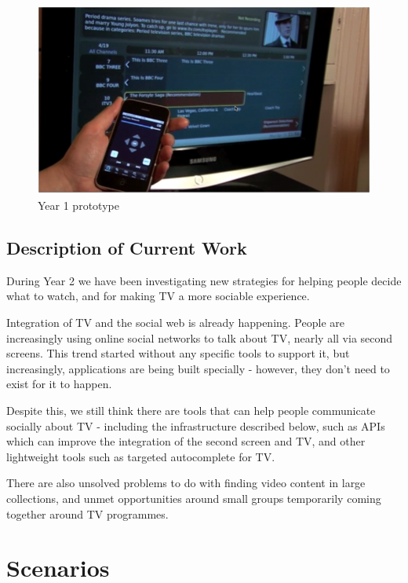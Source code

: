 \documentclass{notube}
\begin{document}
\begin{figure}[htbp]
\begin{center}
\includegraphics[width=6in]{images/year1.png}
\caption{Year 1 prototype} \label{fig:userview}
\end{center}
\end{figure}


\section{Description of Current Work}

During Year 2 we have been investigating new strategies for helping people decide what to watch, and for making TV a more sociable experience.

Integration of TV and the social web is already happening. People are increasingly using online social networks to talk about TV, nearly all via second screens. This trend started without any specific tools to support it, but increasingly, applications are being built specially - however, they don't need to exist for it to happen. 

Despite this, we still think there are tools that can help people communicate socially about TV - including the infrastructure described below, such as APIs which can improve the integration of the second screen and TV, and other lightweight tools such as targeted autocomplete for TV.

There are also unsolved problems to do with finding video content in large collections, and unmet opportunities around small groups temporarily coming together around TV programmes.

\chapter{Scenarios}
\end{document}
